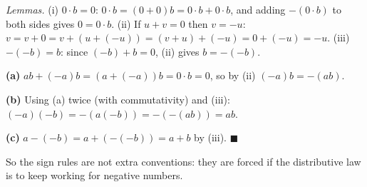 \emph{Lemmas.} (i) $0\cdot b=0$: $0\cdot b=(0+0)b=0\cdot b+0\cdot b$, and adding $-(0\cdot b)$ to both sides gives $0=0\cdot b$. (ii) If $u+v=0$ then $v=-u$: $v=v+0=v+\left(u+(-u)\right)=(v+u)+(-u)=0+(-u)=-u$. (iii) $-(-b)=b$: since $(-b)+b=0$, (ii) gives $b=-(-b)$.

\textbf{(a)} $ab+(-a)b=\left(a+(-a)\right)b=0\cdot b=0$, so by (ii) $(-a)b=-(ab)$.

\textbf{(b)} Using (a) twice (with commutativity) and (iii): $(-a)(-b)=-\left(a(-b)\right)=-\left(-(ab)\right)=ab$.

\textbf{(c)} $a-(-b)=a+\left(-(-b)\right)=a+b$ by (iii). $\blacksquare$

So the sign rules are not extra conventions: they are forced if the distributive law is to keep working for negative numbers.
